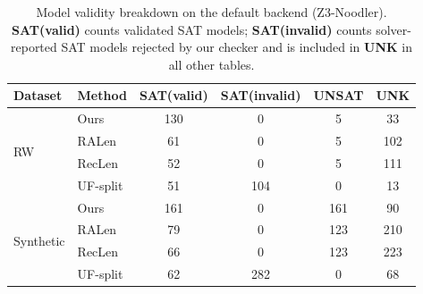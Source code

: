 \begin{table}[t]
    \centering
    \caption{Model validity breakdown on the default backend (Z3-Noodler).
        \textbf{SAT(valid)} counts validated SAT models; \textbf{SAT(invalid)} counts solver-reported SAT models rejected by our checker and is included in \textbf{UNK} in all other tables.}
    \label{tab:validity-summary}
    \setlength{\tabcolsep}{3pt}
    \begin{tabular}{l|l|c|c|c|c}
        \toprule
        \textbf{Dataset} & \textbf{Method} & \textbf{SAT(valid)} & \textbf{SAT(invalid)} & \textbf{UNSAT} & \textbf{UNK} \\
        \midrule
        \multirow{4}{*}{RW}
                         & Ours            & 130        & 0          & 5   & 33 \\
                         & RALen           & 61        & 0          & 5   & 102 \\
                         & RecLen          & 52        & 0          & 5   & 111 \\
                         & UF-split        & 51        & 104          & 0   & 13 \\
        \midrule
        \multirow{4}{*}{Synthetic}
                         & Ours            & 161        & 0          & 161   & 90 \\
                         & RALen           & 79        & 0          & 123   & 210 \\
                         & RecLen          & 66        & 0          & 123   & 223 \\
                         & UF-split        & 62        & 282          & 0   & 68 \\
        \bottomrule
    \end{tabular}
\end{table}

